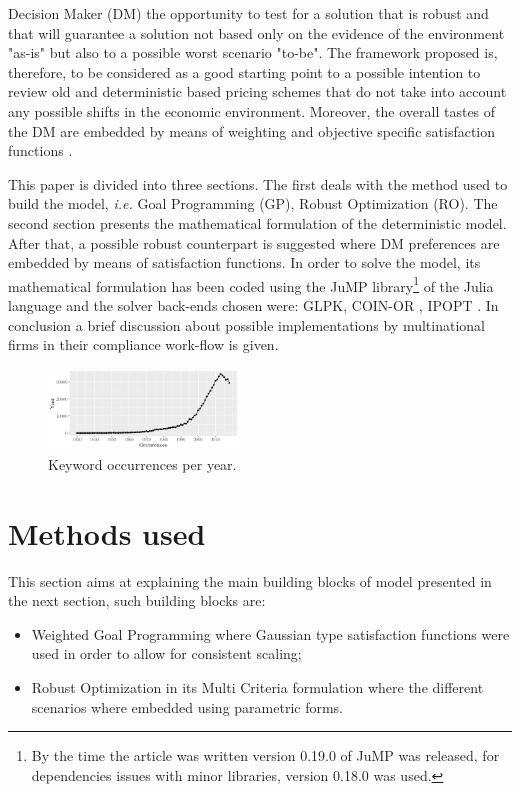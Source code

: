 \documentclass[conference,final,]{IEEEtran}
\begin{document}
Decision Maker (DM) the opportunity to test for a solution that is robust \cite{bertsimas03} and that will guarantee a solution not based only on the evidence of the environment "as-is" but also to a possible worst scenario "to-be". The framework proposed is, therefore, to be considered as a good starting point to a possible intention to review old and deterministic based pricing schemes that do not take into account any possible shifts in the economic environment. Moreover, the overall tastes of the DM are embedded by means of weighting and objective specific satisfaction functions \cite{martel96}.

This paper is divided into three sections. The first deals with the method used to build the model, \emph{i.e.} Goal Programming (GP), Robust Optimization (RO). The second section presents the mathematical formulation of the deterministic model. After that, a possible robust counterpart is suggested where DM preferences are embedded by means of satisfaction functions. In order to solve the model, its mathematical formulation has been coded using the JuMP library\footnote{By the time the article was written version 0.19.0 of JuMP was released, for dependencies issues with minor libraries, version 0.18.0 was used.} \cite{dunning17}\cite{lubin15} of the Julia language \cite{bezanson17} and the solver back-ends chosen were: GLPK, COIN-OR \cite{heimer2003}, IPOPT \cite{waechter05}. In conclusion a brief discussion about possible implementations by multinational firms in their compliance work-flow is given.

\begin{figure}[]
\centering
\includegraphics[width=0.45\textwidth]{figure/fig1-1}
\caption{Keyword occurrences per year.}
\label{keywords}
\end{figure}

\hypertarget{methods-used}{%
  \section{Methods used}\label{methods-used}}
This section aims at explaining the main building blocks of model presented in the next section, such building blocks are:
\begin{itemize}
\item Weighted Goal Programming where Gaussian type satisfaction functions were used in order to allow for consistent scaling; 
\item Robust Optimization in its Multi Criteria formulation where the different scenarios where embedded using parametric forms.  
\end{itemize}
\end{document}
